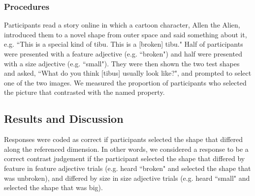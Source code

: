 \documentclass[10pt,letterpaper]{article}
\begin{document}

 

\subsubsection{Procedures}

Participants read a story online in which a cartoon character, Allen the Alien, introduced them to a novel shape from outer space and said something about it, e.g. ``This is a special kind of tibu.  This is a [broken] tibu." Half of participants were presented with a feature adjective (e.g. ``broken") and half were presented with a size adjective (e.g. ``small").  They were then shown the two test shapes and asked, ``What do you think [tibus] usually look like?", and prompted to select one of the two images.  We measured the proportion of participants who selected the picture that contrasted with the named property. 


\subsection{Results and Discussion}

Responses were coded as correct if participants selected the shape that differed along the referenced dimension.  In other words, we considered a response to be a correct contrast judgement if the participant selected the shape that differed by feature in feature adjective trials (e.g. heard ``broken" and selected the shape that was unbroken), and differed by size in size adjective trials (e.g. heard ``small" and selected the shape that was big).  
\end{document}
